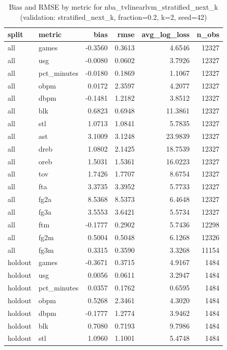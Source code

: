\begin{table}
\caption{Bias and RMSE by metric for nba_tvlinearlvm_stratified_next_k (validation: stratified_next_k, fraction=0.2, k=2, seed=42)}
\label{tab:nba_tvlinearlvm_stratified_next_k_vs_stratified_next_k_f20_k2_s42_bias_rmse}
\begin{tabular}{llrrrr}
\toprule
split & metric & bias & rmse & avg\_log\_loss & n\_obs \\
\midrule
all & games & -0.3560 & 0.3613 & 4.6546 & 12327 \\
all & usg & -0.0080 & 0.0602 & 3.7926 & 12327 \\
all & pct\_minutes & -0.0180 & 0.1869 & 1.1067 & 12327 \\
all & obpm & 0.0172 & 2.3597 & 4.2077 & 12327 \\
all & dbpm & -0.1481 & 1.2182 & 3.8512 & 12327 \\
all & blk & 0.6823 & 0.6948 & 11.3861 & 12327 \\
all & stl & 1.0713 & 1.0841 & 5.7835 & 12327 \\
all & ast & 3.1009 & 3.1248 & 23.9839 & 12327 \\
all & dreb & 1.0802 & 2.1425 & 18.7539 & 12327 \\
all & oreb & 1.5031 & 1.5361 & 16.0223 & 12327 \\
all & tov & 1.7426 & 1.7707 & 8.6754 & 12327 \\
all & fta & 3.3735 & 3.3952 & 5.7733 & 12327 \\
all & fg2a & 8.5368 & 8.5373 & 6.4648 & 12327 \\
all & fg3a & 3.5553 & 3.6421 & 5.5734 & 12327 \\
all & ftm & -0.1777 & 0.2902 & 5.7436 & 12298 \\
all & fg2m & 0.5004 & 0.5048 & 6.1268 & 12326 \\
all & fg3m & 0.3315 & 0.3590 & 3.3268 & 11154 \\
holdout & games & -0.3671 & 0.3715 & 4.9167 & 1484 \\
holdout & usg & 0.0056 & 0.0611 & 3.2947 & 1484 \\
holdout & pct\_minutes & 0.0357 & 0.1762 & 0.6595 & 1484 \\
holdout & obpm & 0.5268 & 2.3461 & 4.3020 & 1484 \\
holdout & dbpm & -0.1777 & 1.2774 & 3.9462 & 1484 \\
holdout & blk & 0.7080 & 0.7193 & 9.7986 & 1484 \\
holdout & stl & 1.0960 & 1.1001 & 5.4748 & 1484 \\

\end{tabular}
\end{table}

